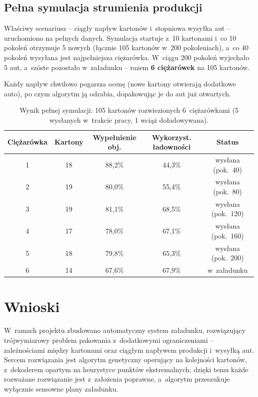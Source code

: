 \documentclass[12pt]{article}
\begin{document}
\subsection{Pełna symulacja strumienia produkcji}

Właściwy scenariusz -- ciągły napływ kartonów i~stopniowa wysyłka aut -- uruchomiono na pełnych danych. Symulacja startuje z~10 kartonami i~co 10 pokoleń otrzymuje 5 nowych (łącznie 105 kartonów w~200 pokoleniach), a~co 40 pokoleń wysyłana jest najpełniejsza ciężarówka. W~ciągu 200 pokoleń wyjechało 5 aut, a~szóste pozostało w~załadunku -- razem \textbf{6 ciężarówek} na 105 kartonów.

Każdy napływ chwilowo pogarsza ocenę (nowe kartony otwierają dodatkowe auto), po czym algorytm ją odrabia, dopakowując je do aut już otwartych.

\begin{table}[H]
\centering
\begin{tabular}{ccccc}
\toprule
Ciężarówka & Kartony & Wypełnienie obj. & Wykorzyst. ładowności & Status \\
\midrule
1 & 18 & 88,2\% & 44,3\% & wysłana (pok.~40)  \\
2 & 19 & 80,0\% & 55,4\% & wysłana (pok.~80)  \\
3 & 19 & 81,1\% & 68,5\% & wysłana (pok.~120) \\
4 & 17 & 78,0\% & 67,1\% & wysłana (pok.~160) \\
5 & 18 & 79,8\% & 65,3\% & wysłana (pok.~200) \\
6 & 14 & 67,6\% & 67,9\% & w~załadunku        \\
\bottomrule
\end{tabular}
\caption{Wynik pełnej symulacji: 105 kartonów rozwiezionych 6~ciężarówkami (5 wysłanych w~trakcie pracy, 1 wciąż doładowywana).}
\end{table}

\section{Wnioski}

W~ramach projektu zbudowano automatyczny system załadunku, rozwiązujący trójwymiarowy problem pakowania z~dodatkowymi ograniczeniami -- zależnościami między kartonami oraz ciągłym napływem produkcji i~wysyłką aut. Sercem rozwiązania jest algorytm genetyczny operujący na kolejności kartonów, z~dekoderem opartym na heurystyce punktów ekstremalnych; dzięki temu każde rozważane rozwiązanie jest z~założenia poprawne, a~algorytm przeszukuje wyłącznie sensowne plany załadunku.
\end{document}
